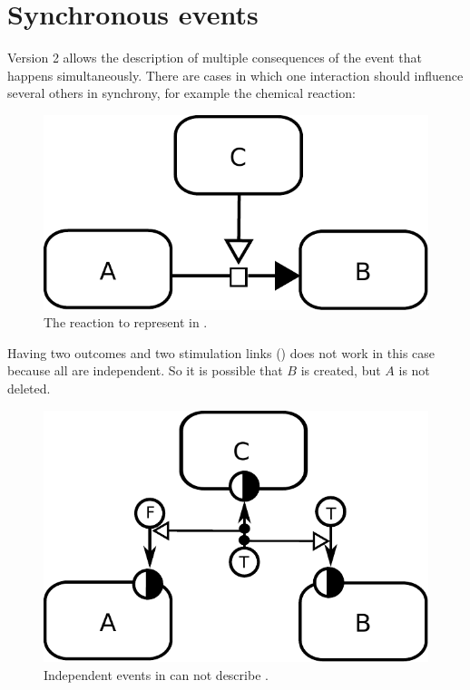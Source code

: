 \section{Synchronous events}\label{sec:syncev}

\SBGNERLone Version 2 allows the description of multiple consequences of the event that happens simultaneously. There are cases in which one interaction should influence several others in synchrony, for example the chemical reaction:

\begin{figure}[H]
  \centering
  \includegraphics[scale = 0.75]{images/synchronous-PD}
  \caption{The reaction to represent in \ER.}
  \label{fig:synchronousPD}
\end{figure}

Having two outcomes and two stimulation links () does not work in this case because all  \ERm are independent. So it is possible that  $B$ is created, but  $A$ is not deleted. 

\begin{figure}[H]
  \centering
  \includegraphics[scale = 0.75]{images/asynchronous}
  \caption{Independent events in \ER can not describe .}
  \label{fig:asynchronous}
\end{figure}

